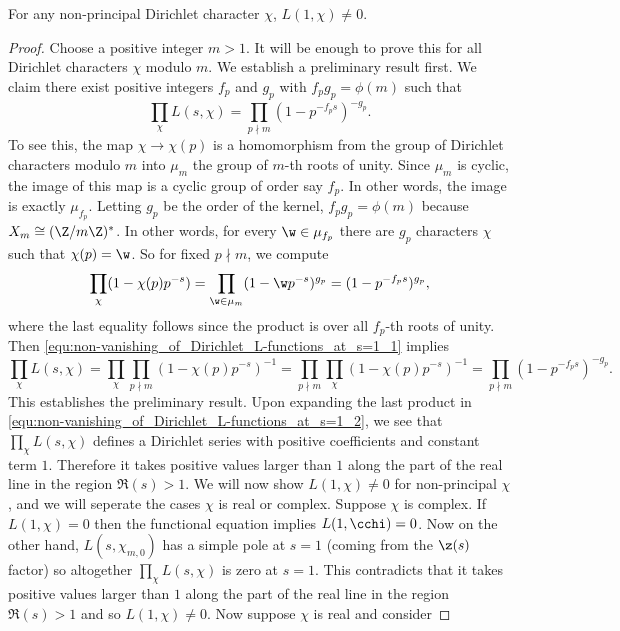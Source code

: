       \begin{theorem}\label{thm:non-vanishing_of_Dirichlet_L-functions_at_s=1}
        For any non-principal Dirichlet character $\chi$, $L(1,\chi) \neq 0$.
      \end{theorem}
      \begin{proof}
        Choose a positive integer $m > 1$. It will be enough to prove this for all Dirichlet characters $\chi$ modulo $m$. We establish a preliminary result first. We claim there exist positive integers $f_{p}$ and $g_{p}$ with $f_{p}g_{p} = \phi(m)$ such that
        \[
          \prod_{\chi}L(s,\chi) = \prod_{p \nmid m}(1-p^{-f_{p}s})^{-g_{p}}.
        \]
        To see this, the map $\chi \to \chi(p)$ is a homomorphism from the group of Dirichlet characters modulo $m$ into $\mu_{m}$ the group of $m$-th roots of unity. Since $\mu_{m}$ is cyclic, the image of this map is a cyclic group of order say $f_{p}$. In other words, the image is exactly $\mu_{f_{p}}$. Letting $g_{p}$ be the order of the kernel, $f_{p}g_{p} = \phi(m)$ because $X_{m} \cong (\Z/m\Z)^{\ast}$. In other words, for every $\w \in \mu_{f_{p}}$ there are $g_{p}$ characters $\chi$ such that $\chi(p) = \w$. So for fixed $p \nmid m$, we compute
        \begin{equation}\label{equ:non-vanishing_of_Dirichlet_L-functions_at_s=1_1}
          \prod_{\chi}(1-\chi(p)p^{-s}) = \prod_{\w \in \mu_{m}}(1-\w p^{-s})^{g_{p}} = (1-p^{-f_{p}s})^{g_{p}},
        \end{equation}
        where the last equality follows since the product is over all $f_{p}$-th roots of unity. Then \cref{equ:non-vanishing_of_Dirichlet_L-functions_at_s=1_1} implies
        \begin{equation}\label{equ:non-vanishing_of_Dirichlet_L-functions_at_s=1_2}
          \prod_{\chi}L(s,\chi) = \prod_{\chi}\prod_{p \nmid m}(1-\chi(p)p^{-s})^{-1} = \prod_{p \nmid m}\prod_{\chi}(1-\chi(p)p^{-s})^{-1} = \prod_{p \nmid m}(1-p^{-f_{p}s})^{-g_{p}}.
        \end{equation}
        This establishes the preliminary result. Upon expanding the last product in \cref{equ:non-vanishing_of_Dirichlet_L-functions_at_s=1_2}, we see that $\prod_{\chi}L(s,\chi)$ defines a Dirichlet series with positive coefficients and constant term $1$. Therefore it takes positive values larger than $1$ along the part of the real line in the region $\Re(s) > 1$. We will now show $L(1,\chi) \neq 0$ for non-principal $\chi$, and we will seperate the cases $\chi$ is real or complex. Suppose $\chi$ is complex. If $L(1,\chi) = 0$ then the functional equation implies $L(1,\cchi) = 0$. Now on the other hand, $L(s,\chi_{m,0})$ has a simple pole at $s = 1$ (coming from the $\z(s)$ factor) so altogether $\prod_{\chi}L(s,\chi)$ is zero at $s = 1$. This contradicts that it takes positive values larger than $1$ along the part of the real line in the region $\Re(s) > 1$ and so $L(1,\chi) \neq 0$. Now suppose $\chi$ is real and consider

\end{proof}
